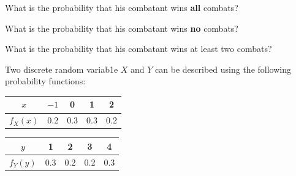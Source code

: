 \documentclass[addpoints]{examsetup}
\begin{document}
\begin{questions}
         \begin{subparts}

               \subpart[3] What is the probability that his combatant wins \textbf{all} combats?
               \hfill {}
               \vspace{4cm}

               \subpart[3] What is the probability that his combatant wins \textbf{no} combats?
               \hfill {}
               \vspace{4cm}
               
               \subpart[3] What is the probability that his combatant wins at least two combats?
               \hfill {}
               \vspace{6cm}       
               
         
         \end{subparts}

\pagebreak


\question
 Two  discrete random variab1e $X$ and  $Y$ can be described using the following probability functions:

\begin{table}[ht]
\begin{minipage}[b]{0.5\linewidth}\centering
\begin{tabular}{c|cccc}
$x$ &$-1$& 0&1&2\\
\hline
$f_X(x)$ & 0.2&0.3 & 0.3&0.2\\
\end{tabular}
\end{minipage}
\hspace{0.5cm}
\begin{minipage}[b]{0.5\linewidth}
\centering
\begin{tabular}{c|cccc}
$y$ &1& 2&3&4\\
\hline
$f_Y(y)$ & 0.3&0.2 & 0.2&0.3\\
\end{tabular}
\end{minipage}
\end{table}
%
\begin{subparts}
      

\end{subparts}
\end{questions}
\end{document}
